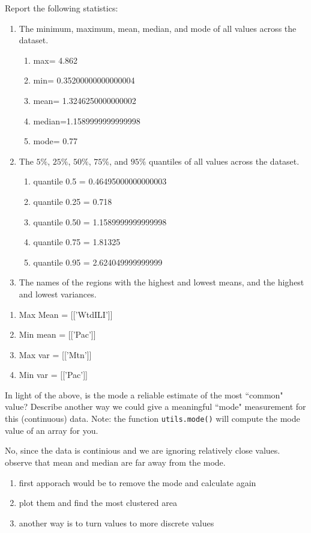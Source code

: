 \documentclass{article}
\def\blu#1{{\color{blu}#1}}
\def\enum#1{\begin{enumerate}#1\end{enumerate}}
\begin{document}
\begin{enumerate}
\blu{Report the following statistics}:
\enum{
\item The minimum, maximum, mean, median, and mode of all values across the dataset.
\begin{enumerate} \color{blu}
\item max= 4.862
\item min= 0.35200000000000004
\item mean= 1.3246250000000002
\item median=1.1589999999999998
\item mode= 0.77
\end{enumerate}
\item The $5\%$, $25\%$, $50\%$, $75\%$, and $95\%$ quantiles of all values across the dataset.
\begin{enumerate} \color{blu}
\item quantile 0.5 = 0.46495000000000003
\item quantile 0.25 = 0.718
\item quantile 0.50 = 1.1589999999999998
\item quantile 0.75 = 1.81325
\item quantile 0.95 = 2.624049999999999
\end{enumerate}
\item The names of the regions with the highest and lowest means, and the highest and lowest variances.
}
\begin{enumerate} \color{blu}
\item Max Mean = [['WtdILI']]
\item Min mean = [['Pac']]
\item Max var  = [['Mtn']]
\item Min var  = [['Pac']]
\end{enumerate}



In light of the above, \blu{is the mode a reliable estimate of the most ``common" value? Describe another way we could give a meaningful ``mode" measurement for this (continuous) data.} Note: the function \texttt{utils.mode()} will compute the mode value of an array for you.

\begin{center}\color{blu} No, since the data is continious and we are ignoring relatively close values. observe that mean and median are far away from the mode.
	\begin{enumerate}
		\item first apporach would be to remove the mode and calculate again
		\item plot them and find the most clustered area
		\item another way is to turn values to more discrete values
	\end{enumerate}
\end{center}



\end{enumerate}
\end{document}
